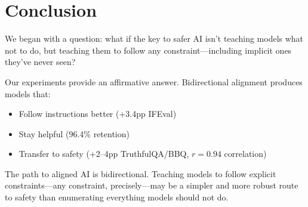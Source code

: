 \section{Conclusion}
\label{sec:conclusion}

We began with a question: what if the key to safer AI isn't teaching models what not to do, but teaching them to follow any constraint---including implicit ones they've never seen?

Our experiments provide an affirmative answer. Bidirectional alignment produces models that:
\begin{itemize}
    \item Follow instructions better (+3.4pp IFEval)
    \item Stay helpful (96.4\% retention)
    \item Transfer to safety (+2--4pp TruthfulQA/BBQ, $r=0.94$ correlation)
\end{itemize}

The path to aligned AI is bidirectional. Teaching models to follow explicit constraints---any constraint, precisely---may be a simpler and more robust route to safety than enumerating everything models should not do.

